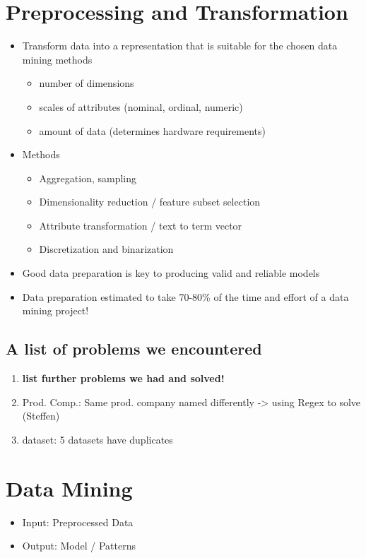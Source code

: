 \chapter{Preprocessing and Transformation}
\label{cha:preprocessing_transformation}
\begin{itemize}
	\item Transform data into a representation that is suitable for the chosen data mining methods
	\begin{itemize}
		\item number of dimensions
		\item scales of attributes (nominal, ordinal, numeric)
		\item amount of data (determines hardware requirements)
	\end{itemize}
	\item Methods
	\begin{itemize}
		\item Aggregation, sampling
		\item Dimensionality reduction / feature subset selection
		\item Attribute transformation / text to term vector
		\item Discretization and binarization
	\end{itemize}
	\item Good data preparation is key to producing valid and reliable models
	\item Data preparation estimated to take 70-80\% of the time and effort of a data mining project!
\end{itemize}

\section{A list of problems we encountered}
\begin{enumerate}
	\item \textbf{list further problems we had and solved!}
	\item Prod. Comp.: Same prod. company named differently -> using Regex to solve (Steffen)
	\item dataset: 5 datasets have duplicates
\end{enumerate}



\chapter{Data Mining}
\label{cha:data_mining}
\begin{itemize}
	\item Input: Preprocessed Data
	\item Output: Model / Patterns
\end{itemize}

